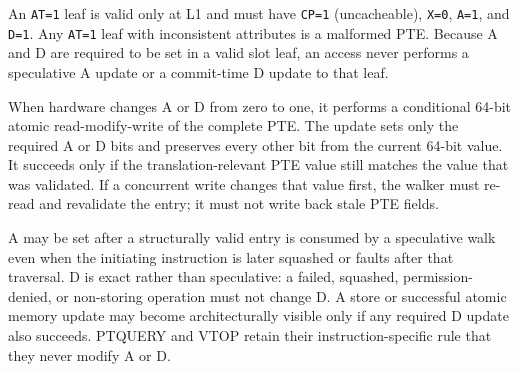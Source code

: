 An \texttt{AT=1} leaf is valid only at L1 and must have \texttt{CP=1} (uncacheable), \texttt{X=0}, \texttt{A=1}, and \texttt{D=1}.
Any \texttt{AT=1} leaf with inconsistent attributes is a malformed PTE. Because A and D are required to be set in a
valid slot leaf, an access never performs a speculative A update or a commit-time D update to that leaf.

When hardware changes A or D from zero to one, it performs a conditional 64-bit atomic read-modify-write of the
complete PTE. The update sets only the required A or D bits and preserves every other bit from the current 64-bit
value. It succeeds only if the translation-relevant PTE value still matches the value that was validated. If a
concurrent write changes that value first, the walker must re-read and revalidate the entry; it must not write back
stale PTE fields.

A may be set after a structurally valid entry is consumed by a speculative walk even when the initiating
instruction is later squashed or faults after that traversal. D is exact rather than speculative: a failed,
squashed, permission-denied, or non-storing operation must not change D. A store or successful atomic memory update
may become architecturally visible only if any required D update also succeeds. PTQUERY and VTOP retain their
instruction-specific rule that they never modify A or D.
